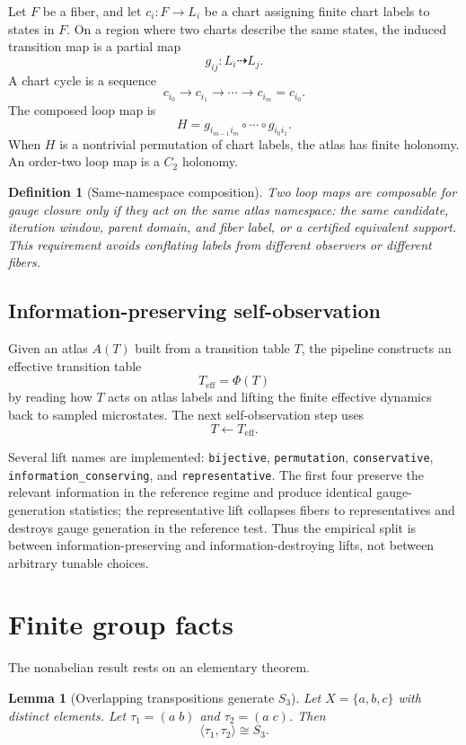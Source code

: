 \documentclass[11pt]{article}
\newtheorem{definition}{Definition}
\newtheorem{lemma}{Lemma}
\begin{document}
Let $F$ be a fiber, and let $c_i:F\to L_i$ be a chart assigning finite chart labels to states in $F$.  On a region where two charts describe the same states, the induced transition map is a partial map
\[
g_{ij}:L_i\dashrightarrow L_j.
\]
A chart cycle is a sequence
\[
c_{i_0}\to c_{i_1}\to\cdots\to c_{i_m}=c_{i_0}.
\]
The composed loop map is
\[
H=g_{i_{m-1}i_m}\circ\cdots\circ g_{i_0 i_1}.
\]
When $H$ is a nontrivial permutation of chart labels, the atlas has finite holonomy.  An order-two loop map is a $C_2$ holonomy.

\begin{definition}[Same-namespace composition]
Two loop maps are composable for gauge closure only if they act on the same atlas namespace: the same candidate, iteration window, parent domain, and fiber label, or a certified equivalent support.  This requirement avoids conflating labels from different observers or different fibers.
\end{definition}

\subsection{Information-preserving self-observation}

Given an atlas $A(T)$ built from a transition table $T$, the pipeline constructs an effective transition table
\[
T_{\mathrm{eff}}=\Phi(T)
\]
by reading how $T$ acts on atlas labels and lifting the finite effective dynamics back to sampled microstates.  The next self-observation step uses
\[
T\leftarrow T_{\mathrm{eff}}.
\]

Several lift names are implemented: \texttt{bijective}, \texttt{permutation}, \texttt{conservative}, \texttt{information\_conserving}, and \texttt{representative}.  The first four preserve the relevant information in the reference regime and produce identical gauge-generation statistics; the representative lift collapses fibers to representatives and destroys gauge generation in the reference test.  Thus the empirical split is between information-preserving and information-destroying lifts, not between arbitrary tunable choices.

\section{Finite group facts}

The nonabelian result rests on an elementary theorem.

\begin{lemma}[Overlapping transpositions generate $S_3$]
Let $X=\{a,b,c\}$ with distinct elements.  Let $\tau_1=(a\;b)$ and $\tau_2=(a\;c)$.  Then
\[
\langle \tau_1,\tau_2\rangle\cong S_3.
\]
\end{lemma}
\end{document}

